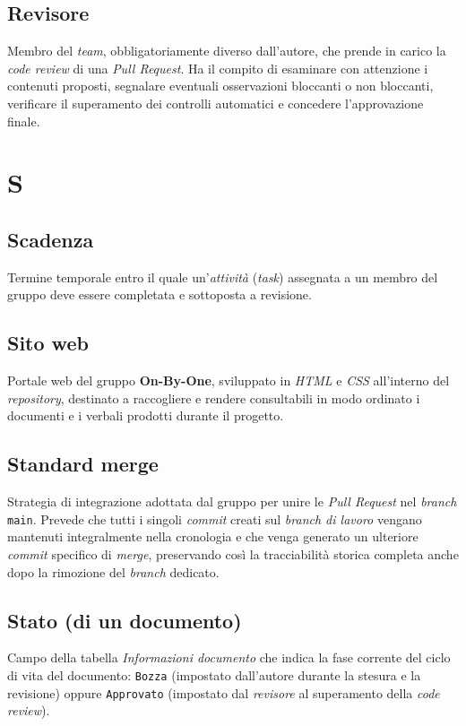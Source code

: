 \documentclass[11pt, a4paper]{article}
\begin{document}
\subsection*{Revisore}
Membro del \textit{team}, obbligatoriamente diverso dall'autore, che prende in carico la \textit{code review} di una \textit{Pull Request}. Ha il compito di esaminare con attenzione i contenuti proposti, segnalare eventuali osservazioni bloccanti o non bloccanti, verificare il superamento dei controlli automatici e concedere l'approvazione finale.

\newpage

\section*{S}

\subsection*{Scadenza}
Termine temporale entro il quale un'\textit{attività} (\textit{task}) assegnata a un membro del gruppo deve essere completata e sottoposta a revisione.

\subsection*{Sito web}
Portale web del gruppo \textbf{On-By-One}, sviluppato in \textit{HTML} e \textit{CSS} all'interno del \textit{repository}, destinato a raccogliere e rendere consultabili in modo ordinato i documenti e i verbali prodotti durante il progetto.

\subsection*{Standard merge}
Strategia di integrazione adottata dal gruppo per unire le \textit{Pull Request} nel \textit{branch} \texttt{main}. Prevede che tutti i singoli \textit{commit} creati sul \textit{branch di lavoro} vengano mantenuti integralmente nella cronologia e che venga generato un ulteriore \textit{commit} specifico di \textit{merge}, preservando così la tracciabilità storica completa anche dopo la rimozione del \textit{branch} dedicato.

\subsection*{Stato (di un documento)}
Campo della tabella \textit{Informazioni documento} che indica la fase corrente del ciclo di vita del documento: \texttt{Bozza} (impostato dall'autore durante la stesura e la revisione) oppure \texttt{Approvato} (impostato dal \textit{revisore} al superamento della \textit{code review}).
\end{document}
